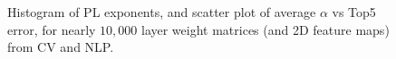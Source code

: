 \begin{figure}[H]
   \centering
   \quad
   \caption{Histogram of PL exponents, and scatter plot of average ${\alpha}$ vs Top5 error, for nearly $10,000$ layer weight matrices (and 2D feature maps) from CV and NLP.
   }
   \label{fig:alphas}
\end{figure}

